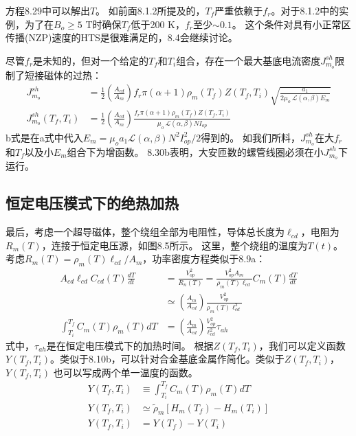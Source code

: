 方程8.29中可以解出$T$。
如前面8.1.2所提及的，$T_f$严重依赖于$f_r$。对于8.1.2中的实例，为了在$B_o\ge 5$ T时确保$T_f$低于200 K，$f_r$至少$\sim 0.1$。
这个条件对具有小正常区传播(NZP)速度的HTS是很难满足的，8.4会继续讨论。

尽管$f_r$是未知的，但对一个给定的$T_f$和$T_i$组合，存在一个最大基底电流密度$J_{m_o}^{sh}$限制了短接磁体的过热：
\begin{subequations}%
	\begin{align}
J_{m_o}^{sh}&=\frac{1}{2}\left(\frac{A_{cd}}{A_m}\right)f_r\pi(\alpha+1)\rho_m(T_f)Z(T_f,T_i)\sqrt{\frac{a_1}{2\mu_o\ \mathcal{L}(\alpha,\beta)E_m}}\\
J_{m_o}^{sh}(T_f,T_i)&=\frac{1}{2}\left(\frac{A_{cd}}{A_m}\right)\frac{f_r\pi(\alpha+1)\rho_m(T_f)Z(T_f,T_i)}{\mu_o\ \mathcal{L}(\alpha,\beta)NI_{op}}
\end{align}
\end{subequations}
b式是在a式中代入$E_m=\mu_o a_1\mathcal{L}(\alpha,\beta)N^2 I_{op}^2/2$得到的。
如我们所料，$J_{m_o}^{sh}$在大$f_r$和$T_f$以及小$E_m$组合下为增函数。
8.30b表明，大安匝数的螺管线圈必须在小$J_{m_o}^{sh}$下运行。


\subsection{恒定电压模式下的绝热加热}
最后，考虑一个超导磁体，整个绕组全部为电阻性，导体总长度为$\ell_{cd}$，电阻为$R_m(T)$，连接于恒定电压源，如图8.5所示。
这里，整个绕组的温度为$T(t)$。
考虑$R_m(T)=\rho_m(T)\ell_{cd}/A_m$，功率密度方程类似于8.9a：
\begin{subequations}%
	\begin{align}
A_{cd}\ell_{cd}C_{cd}(T)\frac{dT}{dt}&=\frac{V_{op}^{2}}{R_n(T)}=\frac{V_{op}^{2}A_m}{\rho_m(T)\ell_{cd}}
C_m(T)\frac{dT}{dt}\\
&\simeq\left(\frac{A_m}{A_{cd}}\right)\frac{V_{op}^{2}}{\rho_m(T)\ell_{cd}^{2}}\\
\int_{T_i}^{T_f}C_m(T)\rho_m(T)dT&=\left(\frac{A_m}{A_{cd}}\right)\frac{V_{op}^{2}}{\ell_{cd}^{2}}\tau_{ah}
\end{align}
\end{subequations}
式中，$\tau_{ah}$是在恒定电压模式下的加热时间。
根据$Z(T_f,T_i)$，我们可以定义函数$Y(T_f,T_i)$。类似于8.10b，可以针对合金基底金属作简化。类似于$Z(T_f,T_i)$，$Y(T_f,T_i)$
也可以写成两个单一温度的函数。
\begin{subequations}%
	\begin{align}
Y(T_f,T_i)&\equiv\int_{T_i}^{T_f}C_m(T)\rho_m(T)dT\\
Y(T_f,T_i)&\simeq\tilde{\rho}_m[H_m(T_f)-H_m(T_i)]\\
Y(T_f,T_i)&=Y(T_f)-Y(T_i)
\end{align}
\end{subequations}

